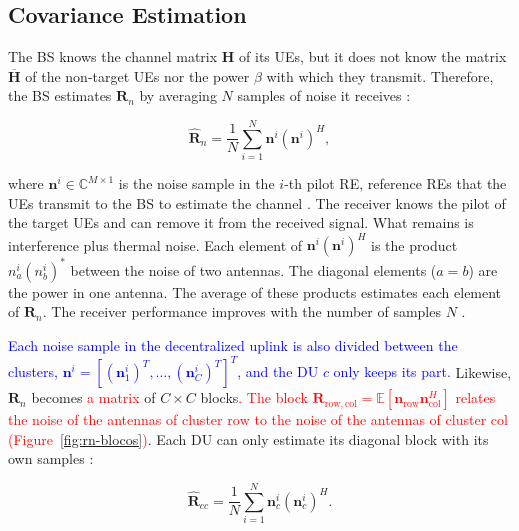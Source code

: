\subsection{Covariance Estimation}\label{subsec:rcc-local}\label{subsec:ruido-colorido}\label{subsubsec:estimacao-R}
The BS knows the channel matrix $\mathbf H$ of its UEs, but it does not know the matrix $\overline{\mathbf H}$ of the non-target UEs nor the power $\beta$ with which they transmit. Therefore, the BS estimates $\mathbf R_n$ by averaging $N$ samples of noise it receives \cite{tomasin-interference}:


\begin{equation}\label{eq:Rn_est}
\widehat{\mathbf R}_n=
\frac{1}{N}
\sum_{i=1}^{N}
\mathbf n^i(\mathbf n^i)^H,
\end{equation}


where $\mathbf n^i\in\mathbb C^{M\times1}$ is the noise sample in the $i$-th pilot RE, reference REs that the UEs transmit to the BS to estimate the channel \cite{marzetta2016fundamentals}. The receiver knows the pilot of the target UEs and can remove it from the received signal. What remains is interference plus thermal noise. Each element of $\mathbf n^i(\mathbf n^i)^H$ is the product $n_a^i(n_b^i)^*$ between the noise of two antennas. The diagonal elements ($a=b$) are the power in one antenna. The average of these products estimates each element of $\mathbf R_n$. The receiver performance improves with the number of samples $N$ \cite{tomasin-interference}.

\textcolor{blue}{Each noise sample in the decentralized uplink is also divided between the clusters, $\mathbf n^i = [(\mathbf n_1^i)^T, \ldots, (\mathbf n_C^i)^T]^T$, and the DU $c$ only keeps its part.} Likewise, $\mathbf R_n$ becomes \textcolor{red}{a matrix} of $C \times C$ blocks\textcolor{red}{. The block $\mathbf R_{\mathrm{row},\mathrm{col}} = \mathbb E[\mathbf n_{\mathrm{row}}\mathbf n_{\mathrm{col}}^H]$ relates the noise of the antennas of cluster $\mathrm{row}$ to the noise of the antennas of cluster $\mathrm{col}$ (Figure~\ref{fig:rn-blocos})}. Each DU can only estimate its diagonal block with its own samples \textcolor{red}{\cite{zhao2021-globecom,zhao2025jsac}}:

\begin{equation}
\hat{\mathbf R}_{cc}=
\frac{1}{N}
\sum_{i=1}^{N}
\mathbf n_c^i(\mathbf n_c^i)^H.
\label{eq:Rcc_est}
\end{equation}

